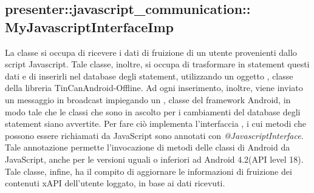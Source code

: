 \documentclass[../Tesi.tex]{subfiles}
\begin{document}
		\subsection{presenter::javascript\_communication::\\MyJavascriptInterfaceImp}
		La classe  si occupa di ricevere i dati di fruizione di un utente provenienti dallo script Javascript. Tale classe, inoltre, si occupa di trasformare in statement questi dati e di inserirli nel database degli statement, utilizzando un oggetto , classe della libreria TinCanAndroid-Offline. Ad ogni inserimento, inoltre, viene inviato un messaggio in broadcast impiegando un , classe del framework Android, in modo tale che le classi che sono in ascolto per i cambiamenti del database degli statement siano avvertite. Per fare ciò implementa l'interfaccia , i cui metodi che possono essere richiamati da JavaScript sono annotati con \textit{@JavascriptInterface}. Tale annotazione permette l'invocazione di metodi delle classi di Android da JavaScript, anche per le versioni uguali o inferiori ad Android 4.2(API level 18). Tale classe, infine, ha il compito di aggiornare le informazioni di fruizione dei contenuti xAPI dell'utente loggato, in base ai dati ricevuti. 
\end{document}
